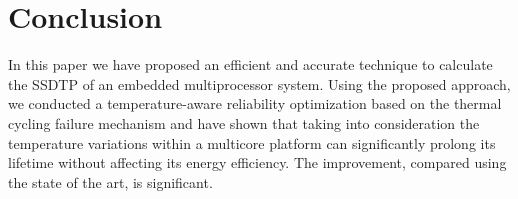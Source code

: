 \section{Conclusion}

In this paper we have proposed an efficient and accurate technique to calculate
the SSDTP of an embedded multiprocessor system. Using the proposed approach, we
conducted a temperature-aware reliability optimization based on the thermal
cycling failure mechanism and have shown that taking into consideration the
temperature variations within a multicore platform can significantly prolong its
lifetime without affecting its energy efficiency. The improvement, compared
using the state of the art, is significant.
